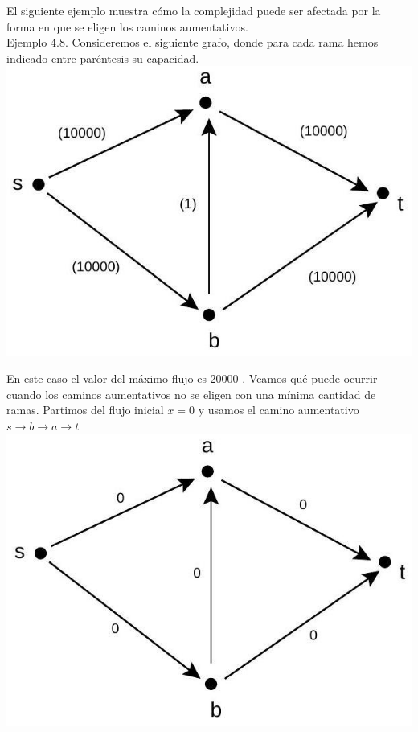 \documentclass[10pt]{article}
\begin{document}
El siguiente ejemplo muestra cómo la complejidad puede ser afectada por la forma en que se eligen los caminos aumentativos.\\
Ejemplo 4.8. Consideremos el siguiente grafo, donde para cada rama hemos indicado entre paréntesis su capacidad.\\
\includegraphics[max width=\textwidth, center]{2025_09_05_aa5f7b8425e7dd302062g-12(2)}

En este caso el valor del máximo flujo es 20000 . Veamos qué puede ocurrir cuando los caminos aumentativos no se eligen con una mínima cantidad de ramas. Partimos del flujo inicial $x=0$ y usamos el camino aumentativo $s \longrightarrow b \longrightarrow a \longrightarrow t$\\
\includegraphics[max width=\textwidth, center]{2025_09_05_aa5f7b8425e7dd302062g-12}
\end{document}
